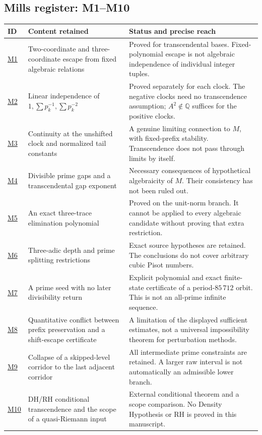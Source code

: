 \documentclass[11pt,a4paper]{article}
\numberwithin{equation}{section}
\theoremstyle{definition}
\theoremstyle{remark}
\newcommand{\Q}{\mathbb Q}
\begin{document}
\clearpage
\subsection{Mills register: M1--M10}
\label{intro:mills-register}
\small
\begin{longtable}{@{}p{}>{\raggedright\arraybackslash}p{}>{\raggedright\arraybackslash}p{}@{}}
\toprule
ID & Content retained & Status and precise reach\\
\midrule\endhead
\hyperref[mi:affine]{M1} & Two-coordinate and three-coordinate escape from fixed algebraic relations & Proved for transcendental bases.  Fixed-polynomial escape is not algebraic independence of individual integer tuples.\\[6pt]
\hyperref[rs:independence]{M2} & Linear independence of $1,\sum p_k^{-1},\sum p_k^{-2}$ & Proved separately for each clock.  The negative clocks need no transcendence assumption; $A^2\notin\Q$ suffices for the positive clocks.\\[6pt]
\hyperref[mi:tail-limit]{M3} & Continuity at the unshifted clock and normalized tail constants & A genuine limiting connection to $M$, with fixed-prefix stability.  Transcendence does not pass through limits by itself.\\[6pt]
\hyperref[mi:gap-theorem]{M4} & Divisible prime gaps and a transcendental gap exponent & Necessary consequences of hypothetical algebraicity of $M$.  Their consistency has not been ruled out.\\[6pt]
\hyperref[mi:unit-polynomial]{M5} & An exact three-trace elimination polynomial & Proved on the unit-norm branch.  It cannot be applied to every algebraic candidate without proving that extra restriction.\\[6pt]
\hyperref[mi:depth]{M6} & Three-adic depth and prime splitting restrictions & Exact source hypotheses are retained.  The conclusions do not cover arbitrary cubic Pisot numbers.\\[6pt]
\hyperref[mi:seed]{M7} & A prime seed with no later divisibility return & Explicit polynomial and exact finite-state certificate of a period-$85\,712$ orbit.  This is not an all-prime infinite sequence.\\[6pt]
\hyperref[mi:preserve]{M8} & Quantitative conflict between prefix preservation and a shift-escape certificate & A limitation of the displayed sufficient estimates, not a universal impossibility theorem for perturbation methods.\\[6pt]
\hyperref[mi:terminal]{M9} & Collapse of a skipped-level corridor to the last adjacent corridor & All intermediate prime constraints are retained.  A larger raw interval is not automatically an admissible lower branch.\\[6pt]
\hyperref[mi:rh]{M10} & DH/RH conditional transcendence and the scope of a quasi-Riemann input & External conditional theorem and a scope comparison.  No Density Hypothesis or RH is proved in this manuscript.\\
\bottomrule
\end{longtable}
\normalsize
\clearpage
\end{document}
